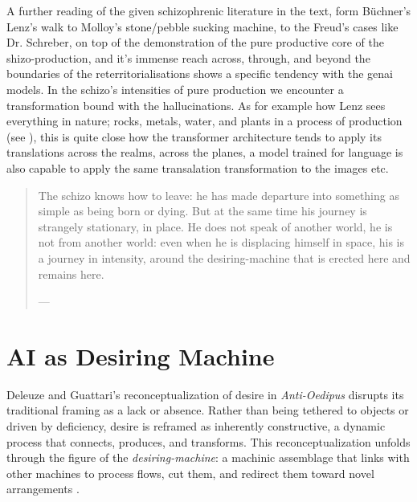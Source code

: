 \begin{orangebox}
	A further reading of the given schizophrenic literature in the text, form
	Büchner's Lenz's walk to Molloy's stone/pebble sucking machine, to the Freud's
	cases like Dr. Schreber, on top of the demonstration of the pure productive
	core of the shizo-production, and it's immense reach across, through, and
	beyond the boundaries of the reterritorialisations shows a specific tendency
	with the \gls{genai} models. In the schizo's intensities of pure production we
	encounter a transformation bound with the hallucinations. As for example how Lenz sees everything in nature; rocks, metals, water, and plants in a process of production (see \cite[41]{buchanan2008b}), this is quite close how the transformer architecture tends to apply its translations across the realms, across the planes, a model trained for language is also capable to apply the same transalation transformation to the images etc.
\end{orangebox}




\begin{quote}
	The schizo knows how to leave: he has made departure into something as simple as being born or dying. But at the same time his journey is strangely stationary, in place. He does not speak of another world, he is not from another world: even when he is displacing himself in space, his is a journey in intensity, around the desiring-machine that is erected here and remains here.

	— \cite[131]{deleuze1983}
\end{quote}



\section{AI as Desiring Machine}

Deleuze and Guattari’s reconceptualization of desire in \textit{Anti-Oedipus} disrupts its traditional framing as a lack or absence. Rather than being tethered to objects or driven by deficiency, desire is reframed as inherently constructive, a dynamic process that connects, produces, and transforms. This reconceptualization unfolds through the figure of the \textit{desiring-machine}: a machinic assemblage that links with other machines to process flows, cut them, and redirect them toward novel arrangements \parencite{deleuze1983}.


